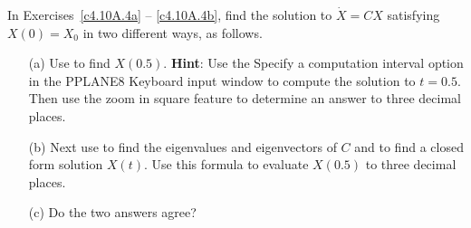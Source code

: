 \documentclass{ximera}
\begin{document}
\noindent In Exercises~\ref{c4.10A.4a} -- \ref{c4.10A.4b}, find the solution 
to $\dot{X} = CX$ satisfying $X(0)=X_0$ in two different ways, as follows.  
\begin{itemize}
\item[(a)]  Use {\pplane} to find $X(0.5)$.  {\bf Hint}: Use the 
{\sf Specify a computation interval} option in the {\sf PPLANE8 Keyboard input} 
window to compute the solution to $t=0.5$. Then use the {\sf zoom in square} 
feature to determine an answer to three decimal places.  
\item[(b)]  Next use \Matlab to find the eigenvalues and eigenvectors of $C$ 
and to find a closed form solution $X(t)$.  Use this formula to evaluate 
$X(0.5)$ to three decimal places.    
\item[(c)]  Do the two answers agree?
\end{itemize}
\end{document}
